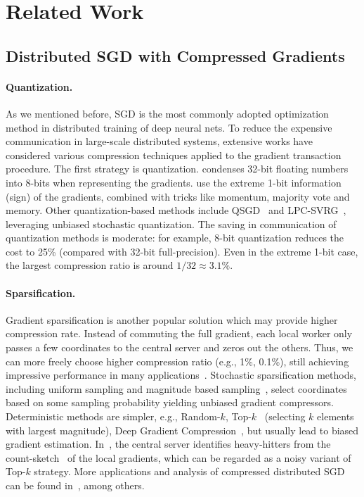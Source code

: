 \documentclass[11pt]{article}
\begin{document}
\section{Related Work}\label{sec:related}

\subsection{Distributed SGD with Compressed Gradients}

\paragraph{Quantization.} As we mentioned before, SGD is the most commonly adopted optimization method in distributed training of deep neural nets. To reduce the expensive communication in large-scale distributed systems, extensive works have considered various compression techniques applied to the gradient transaction procedure. The first strategy is quantization. \cite{Proc:8-bit_ICLR16} condenses 32-bit floating numbers into 8-bits when representing the gradients. \cite{Proc:Seide14,bernstein2018signsgd,karimireddy2019error,Proc:Bernstein_ICLR19} use the extreme 1-bit information (sign) of the gradients, combined with tricks like momentum, majority vote and memory. Other quantization-based methods include QSGD~\cite{alistarh2017qsgd,Proc:Wu_ICML18,Proc:Zhang_ICML17} and LPC-SVRG~\cite{Proc:Yu_AISTATS19}, leveraging unbiased stochastic quantization. The saving in communication of quantization methods is moderate: for example, 8-bit quantization reduces the cost to 25\% (compared with 32-bit full-precision). Even in the extreme 1-bit case, the largest compression ratio is around $1/32\approx 3.1\%$. 

\paragraph{Sparsification.} Gradient sparsification is another popular solution which may provide higher compression rate. Instead of commuting the full gradient, each local worker only passes a few coordinates to the central server and zeros out the others. Thus, we can more freely choose higher compression ratio (e.g., 1\%, 0.1\%), still achieving impressive performance in many applications~\cite{Proc:Lin_ICLR18}. Stochastic sparsification methods, including uniform sampling and magnitude based sampling~\cite{wangni2018gradient}, select coordinates based on some sampling probability yielding unbiased gradient compressors. Deterministic methods are simpler, e.g., Random-$k$, Top-$k$~\cite{stich2018sparsified,shi2019convergence} (selecting $k$ elements with largest magnitude), Deep Gradient Compression~\cite{Proc:Lin_ICLR18}, but usually lead to biased gradient estimation. In~\cite{Proc:Ivkin_NIPS19}, the central server identifies heavy-hitters from the count-sketch~\cite{Proc:Charikar_ICALP02} of the local gradients, which can be regarded as a noisy variant of Top-$k$ strategy. More applications and analysis of compressed distributed SGD can be found in~\cite{jiang2018linear,Proc:Shen_ICML18,alistarh2018convergence,Proc:Basu_NIPS19,Proc:Jiang_SIGMOD18}, among others.
\end{document}
